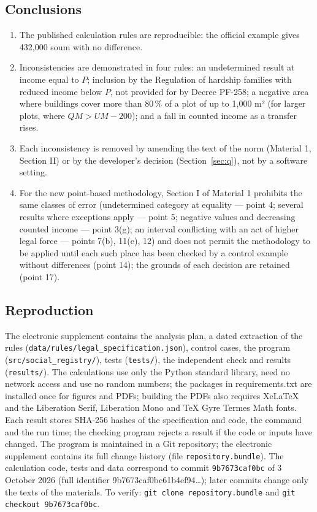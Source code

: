 \documentclass[14pt,a4paper]{extarticle}
\begin{document}
\subsection{Conclusions}
\begin{enumerate}[leftmargin=1.27cm]
\item The published calculation rules are reproducible: the official example gives 432,000 soum with no difference.
\item Inconsistencies are demonstrated in four rules: an undetermined result at income equal to $P$; inclusion by the Regulation of hardship families with reduced income below $P$, not provided for by Decree PF-258; a negative area where buildings cover more than 80\,\% of a plot of up to 1,000 m² (for larger plots, where $QM>UM-200$); and a fall in counted income as a transfer rises.
\item Each inconsistency is removed by amending the text of the norm (Material 1, Section II) or by the developer’s decision (Section~\ref{sec:q}), not by a software setting.
\item For the new point-based methodology, Section I of Material 1 prohibits the same classes of error (undetermined category at equality — point 4; several results where exceptions apply — point 5; negative values and decreasing counted income — point 3(g); an interval conflicting with an act of higher legal force — points 7(b), 11(e), 12) and does not permit the methodology to be applied until each such place has been checked by a control example without differences (point 14); the grounds of each decision are retained (point 17).
\end{enumerate}

\subsection{Reproduction}
The electronic supplement contains the analysis plan, a dated extraction of the rules (\nolinkurl{data/rules/legal_specification.json}), control cases, the program (\nolinkurl{src/social_registry/}), tests (\nolinkurl{tests/}), the independent check and results (\nolinkurl{results/}). The calculations use only the Python standard library, need no network access and use no random numbers; the packages in requirements.txt are installed once for figures and PDFs; building the PDFs also requires XeLaTeX and the Liberation Serif, Liberation Mono and TeX Gyre Termes Math fonts. Each result stores SHA-256 hashes of the specification and code, the command and the run time; the checking program rejects a result if the code or inputs have changed. The program is maintained in a Git repository; the electronic supplement contains its full change history (file \nolinkurl{repository.bundle}). The calculation code, tests and data correspond to commit \nolinkurl{9b7673caf0bc} of 3 October 2026 (full identifier 9b7673caf0bc61b4ef94\ldots); later commits change only the texts of the materials. To verify: \nolinkurl{git clone repository.bundle} and \nolinkurl{git checkout 9b7673caf0bc}.
\end{document}
